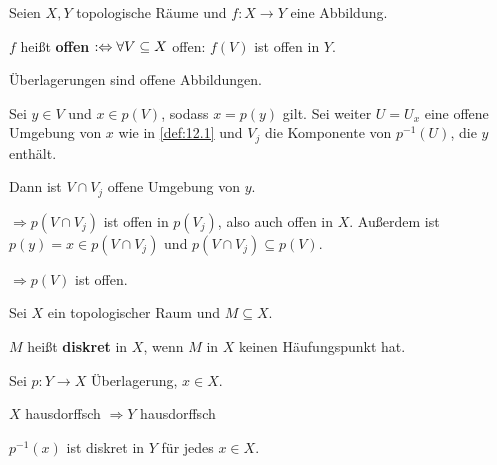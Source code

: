 \begin{definition}
    Seien $X, Y$ topologische Räume und $f:X \rightarrow Y$ eine 
    Abbildung.

    $f$ heißt \textbf{offen} $:\Leftrightarrow \forall V \subseteq X$ offen: $f(V)$ ist offen in $Y$.
\end{definition}

\begin{bemerkung}\label{bem:12.2} %
    Überlagerungen sind offene Abbildungen.
\end{bemerkung}

\begin{beweis}
    Sei $y \in V$ und $x \in p(V)$, sodass $x=p(y)$ gilt.
    Sei weiter $U = U_x$ eine offene Umgebung von $x$ wie in \cref{def:12.1}
    und $V_j$ die Komponente von $p^{-1}(U)$, die $y$ enthält.

    Dann ist $V \cap V_j$ offene Umgebung von $y$.

    $\Rightarrow p(V \cap V_j)$ ist offen in $p(V_j)$, also auch offen
    in $X$. Außerdem ist $p(y) = x \in p(V \cap V_j)$ und
    $p(V \cap V_j) \subseteq p(V)$.

    $\Rightarrow p(V)$ ist offen.
\end{beweis}

\begin{definition}
    Sei $X$ ein topologischer Raum und $M \subseteq X$.

    $M$ heißt \textbf{diskret} in $X$, wenn $M$ in $X$ keinen 
    Häufungspunkt hat.
\end{definition}

\begin{bemerkung} %
    Sei $p: Y \rightarrow X$ Überlagerung, $x \in X$.
    \begin{bemenum}
        \item $X$ hausdorffsch $\Rightarrow Y$ hausdorffsch
        \item $p^{-1}(x)$ ist diskret in $Y$ für jedes $x \in X$.
    \end{bemenum}
\end{bemerkung}

